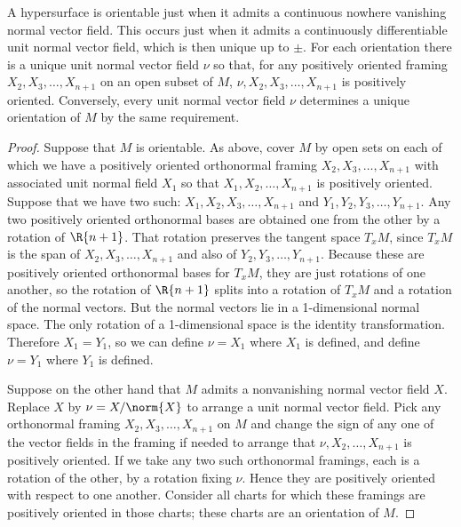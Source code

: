 \begin{theorem}
A hypersurface is orientable just when it admits a continuous nowhere vanishing normal
vector field. 
This occurs just when it admits a continuously differentiable unit normal vector field, which is then unique up to \(\pm\).
For each orientation there is a unique unit normal vector field \(\nu\) so that, for any positively oriented framing \(X_2, X_3, \dots, X_{n+1}\) on an open subset of \(M\), \(\nu, X_2, X_3, \dots, X_{n+1}\) is positively oriented.
Conversely, every unit normal vector field \(\nu\) determines a unique orientation of \(M\) by the same requirement.
\end{theorem}
\begin{proof}
Suppose that \(M\) is orientable.
As above, cover \(M\) by open sets on each of which we have a positively oriented orthonormal framing \(X_2, X_3, \dots, X_{n+1}\) with associated unit normal field \(X_1\) so that \(X_1, X_2, \dots, X_{n+1}\) is positively oriented.
Suppose that we have two such: \(X_1, X_2, X_3, \dots, X_{n+1}\) and \(Y_1, Y_2, Y_3, \dots, Y_{n+1}\).
Any two positively oriented orthonormal bases are obtained one from the other by a rotation of \(\R{n+1}\).
That rotation preserves the tangent space \(T_x M\), since \(T_x M\) is the span of \(X_2, X_3, \dots, X_{n+1}\) and also of \(Y_2, Y_3, \dots, Y_{n+1}\).
Because these are positively oriented orthonormal bases for \(T_x M\), they are just rotations of one another, so the rotation of \(\R{n+1}\) splits into a rotation of \(T_x M\) and a rotation of the normal vectors.
But the normal vectors lie in a 1-dimensional normal space.
The only rotation of a 1-dimensional space is the identity transformation.
Therefore \(X_1=Y_1\), so we can define \(\nu=X_1\) where \(X_1\) is defined, and define \(\nu=Y_1\) where \(Y_1\) is defined.

Suppose on the other hand that \(M\) admits a nonvanishing normal vector field \(X\).
Replace \(X\) by \(\nu=X/\norm{X}\) to arrange a unit normal vector field.
Pick any orthonormal framing \(X_2, X_3, \dots, X_{n+1}\) on \(M\) and change the sign of any one of the vector fields in the framing if needed to arrange that \(\nu, X_2, \dots, X_{n+1}\) is positively oriented.
If we take any two such orthonormal framings, each is a rotation of the other, by a rotation fixing \(\nu\).
Hence they are positively oriented with respect to one another.
Consider all charts for which these framings are positively oriented in those charts; these charts are an orientation of \(M\).
\end{proof}

